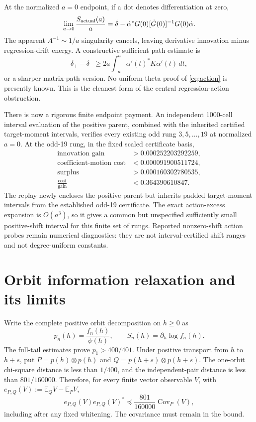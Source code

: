 \documentclass[11pt]{article}
\theoremstyle{definition}
\theoremstyle{remark}
\newcommand{\E}{\mathbb{E}}
\newcommand{\Cov}{\operatorname{Cov}}
\begin{document}
At the normalized $a=0$ endpoint, if a dot denotes differentiation at zero,
\begin{equation}
 \lim_{a\to0}\frac{S_{\rm actual}(a)}a
 =\dot\delta-\dot\alpha^*G(0)[\dot G(0)]^{-1}G(0)\dot\alpha.
 \label{eq:endpoint-innovation}
\end{equation}
The apparent $A^{-1}\sim1/a$ singularity cancels, leaving derivative innovation
minus regression-drift energy. A constructive sufficient path estimate is
\begin{equation}
 \delta_+-\delta_-
 \ge 2a\int_{-a}^{a}\alpha'(t)^*K\alpha'(t)\,dt,
 \label{eq:action}
\end{equation}
or a sharper matrix-path version. No uniform theta proof of
\eqref{eq:action} is presently known. This is the cleanest form of the central
regression-action obstruction.

There is now a rigorous finite endpoint payment. An independent 1000-cell
interval evaluation of the positive parent, combined with the inherited
certified target-moment intervals, verifies every existing odd rung
$3,5,\ldots,19$ at normalized $a=0$. At the odd-19 rung, in the fixed scaled
certificate basis,
\begin{align}
 \text{innovation gain}&>0.000252203292259,\nonumber\\
 \text{coefficient-motion cost}&<0.000091900511724,\nonumber\\
 \text{surplus}&>0.000160302780535,\nonumber\\
 \frac{\text{cost}}{\text{gain}}&<0.364390610847.
 \label{eq:odd19-payment}
\end{align}
The replay newly encloses the positive parent but inherits padded target-moment
intervals from the established odd-19 certificate. The exact action-excess
expansion is $O(a^3)$, so it gives a common but unspecified sufficiently small
positive-shift interval for this finite set of rungs. Reported nonzero-shift
action probes remain numerical diagnostics: they are not interval-certified
shift ranges and not degree-uniform constants.

\section{Orbit information relaxation and its limits}

Write the complete positive orbit decomposition on $h\ge0$ as
\begin{equation}
 p_n(h)=\frac{f_n(h)}{\psi(h)},\qquad
 S_n(h)=\partial_h\log f_n(h).
\end{equation}
The full-tail estimates prove $p_1>400/401$. Under positive transport from
$h$ to $h+s$, put $P=p(h)\otimes p(h)$ and
$Q=p(h+s)\otimes p(h+s)$. The one-orbit chi-square distance is less than
$1/400$, and the independent-pair distance is less than $801/160000$.
Therefore, for every finite vector observable $V$, with
$e_{P,Q}(V):=\E_QV-\E_PV$,
\begin{equation}
 e_{P,Q}(V)e_{P,Q}(V)^*\preceq\frac{801}{160000}\Cov_P(V),
 \label{eq:chi-cov}
\end{equation}
including after any fixed whitening. The covariance must remain in the bound.
\end{document}
